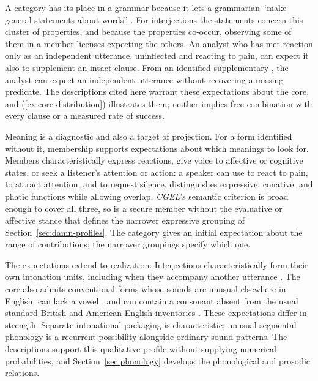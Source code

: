 \documentclass[12pt]{article}
\begin{document}
A category has its place in a grammar because it lets a grammarian
\enquote{make general statements about words} \citep[30]{HuddlestonPullum2002}.
For interjections the statements concern this cluster of properties, and
because the properties co-occur, observing some of them in a member
licenses expecting the others. An analyst who has met reaction
 only as an independent utterance, uninflected and reacting
to pain, can expect it also to supplement an intact clause. From an
identified supplementary , the analyst can expect an
independent utterance without recovering a missing predicate. The
descriptions cited here warrant these expectations about the core, and
(\ref{ex:core-distribution}) illustrates them; neither implies free
combination with every clause or a measured rate of success.

Meaning is a diagnostic and also a target of projection. For a form
identified without it, membership supports expectations about which
meanings to look for. Members characteristically express reactions, give
voice to affective or cognitive states, or seek a listener's attention or
action: a speaker can use  to react to pain, 
to attract attention, and  to request silence.
\textcite[113--115]{ameka1992} distinguishes expressive, conative, and
phatic functions while allowing overlap. \textit{CGEL}'s semantic criterion
is broad enough to cover all three, so  is a secure member
without the evaluative or affective stance that defines the narrower
expressive grouping of Section~\ref{sec:damn-profiles}. The category gives
an initial expectation about the range of contributions; the narrower
groupings specify which one.

The expectations extend to realization. Interjections characteristically
form their own intonation units, including when they accompany another
utterance \citep[108]{ameka1992}. The core also admits conventional forms
whose sounds are unusual elsewhere in English:  can lack a
vowel \citep[105--106]{ameka1992}, and  can contain a
consonant absent from the usual standard British and American English
inventories \citep[74, 853]{quirk1985}. These expectations differ in
strength. Separate intonational packaging is characteristic; unusual
segmental phonology is a recurrent possibility alongside ordinary sound
patterns. The descriptions support this qualitative profile without
supplying numerical probabilities, and Section~\ref{sec:phonology} develops
the phonological and prosodic relations.
\end{document}
